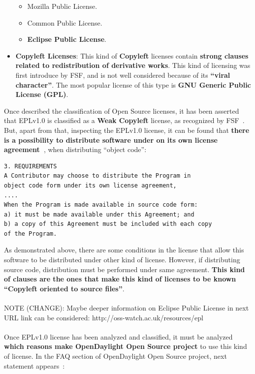 \documentclass[a4paper, 12pt]{book}
\begin{document}
\begin{itemize}
   \begin{itemize}\itemsep0pt
    \item{Mozilla Public License}.
    \item{Common Public License}.
    \item{\textbf{Eclipse Public License}}.
   \end{itemize}
 \item{\textbf{Copyleft Licenses}}: This kind of \textbf{Copyleft} licenses contain \textbf{strong clauses related to redistribution of derivative works}. This kind of licensing was first introduce by FSF, and is not well considered because of its \textbf{``viral character''}. The most popular license of this type is \textbf{GNU Generic Public License (GPL)}.
\end{itemize}
Once described the classification of Open Source licenses, it has been asserted that EPLv1.0 is classified as a \textbf{Weak Copyleft} license, as recognized by FSF~\cite{FSFEPL}. But, apart from that, inspecting the EPLv1.0 license, it can be found that \textbf{there is a possibility to distribute software under on its own license agreement~\cite{EPLv1}}, when distributing ``object code'':
\begin{verbatim}
3. REQUIREMENTS
A Contributor may choose to distribute the Program in
object code form under its own license agreement,
....
When the Program is made available in source code form:
a) it must be made available under this Agreement; and
b) a copy of this Agreement must be included with each copy
of the Program.
\end{verbatim}
As demonstrated above, there are some conditions in the license that allow this software to be distributed under other kind of license. However, if distributing source code, distribution must be performed under same agreement. \textbf{This kind of clauses are the ones that make this kind of licenses to be known ``Copyleft oriented to source files''}.\\
\\
NOTE (CHANGE): Maybe deeper information on Eclipse Public License in next URL link can be considered: http://oss-watch.ac.uk/resources/epl\\
\\
Once EPLv1.0 license has been analyzed and classified, it must be analyzed \textbf{which reasons make OpenDaylight Open Source project} to use this kind of license. In the FAQ section of OpenDaylight Open Source project, next statement appears~\cite{OpenDaylightFAQ5}:
\end{document}
